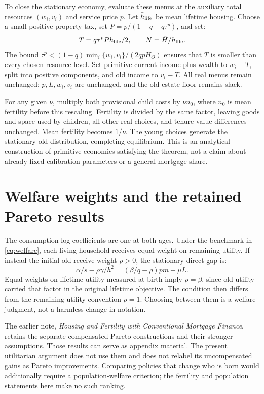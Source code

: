\documentclass[11pt]{article}
\begin{document}
To close the stationary economy, evaluate these menus at the auxiliary total
resources $(w_i,v_i)$ and service price $p$. Let $\bar h_{\rm life}$ be
mean lifetime housing. Choose a small positive property tax, set
$P=p/(1-q+q\tau^p)$, and set:
\begin{equation}
T=q\tau^pP\bar h_{\rm life}/2,\qquad
N=\bar H/\bar h_{\rm life}.
\end{equation}
The bound
$\tau^p<(1-q)\min_i\{w_i,v_i\}/(2qpH_O)$ ensures that $T$ is smaller
than every chosen resource level. Set primitive current income plus wealth
to $w_i-T$, split into positive components, and old income to $v_i-T$.
All real menus remain unchanged: $p,L,w_i,v_i$ are unchanged, and the
old estate floor remains slack.

For any given $\nu$, multiply both provisional child costs by
$\nu\bar n_0$, where $\bar n_0$ is mean fertility before this rescaling.
Fertility is divided by the same factor, leaving goods and space used by
children, all other real choices, and tenure-value differences unchanged.
Mean fertility becomes $1/\nu$. The young choices generate the stationary
old distribution, completing equilibrium. This is an analytical construction
of primitive economies satisfying the theorem, not a claim about already
fixed calibration parameters or a general mortgage share.

\section{Welfare weights and the retained Pareto results}
\label{app:weights}

The consumption-log coefficients are one at both ages. Under the benchmark
in \eqref{eq:welfare}, each living household receives equal weight on
remaining utility. If instead the initial old receive weight $\rho>0$,
the stationary direct gap is:
\begin{equation}
\alpha/s-\rho\gamma/h^2=(\beta/q-\rho)pm+\mu L.
\end{equation}
Equal weights on lifetime utility measured at birth imply $\rho=\beta$,
since old utility carried that factor in the original lifetime objective.
The condition then differs from the remaining-utility convention $\rho=1$.
Choosing between them is a welfare judgment, not a harmless change in notation.

The earlier note, \emph{Housing and Fertility with Conventional Mortgage
Finance}, retains the separate compensated Pareto constructions and their
stronger assumptions. Those results can serve as appendix material. The
present utilitarian argument does not use them and does not relabel its
uncompensated gains as Pareto improvements. Comparing policies that change
who is born would additionally require a population-welfare criterion;
the fertility and population statements here make no such ranking.
\end{document}
